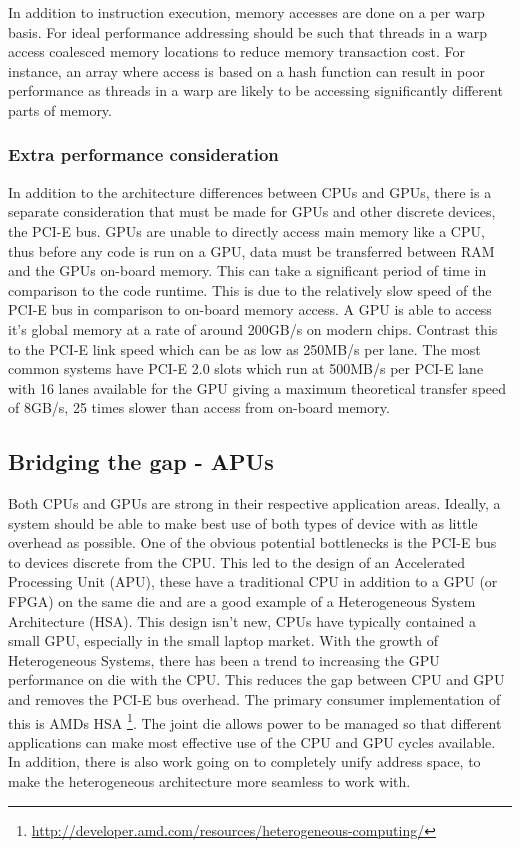 In addition to instruction execution, memory accesses are done on a per warp
basis. For ideal performance addressing should be such that threads in a warp
access coalesced memory locations to reduce memory transaction cost. For
instance, an array where access is based on a hash function can result in poor
performance as threads in a warp are likely to be accessing significantly
different parts of memory.

\subsubsection{Extra performance consideration}

In addition to the architecture differences between CPUs and GPUs, there is a
separate consideration that must be made for GPUs and other discrete devices,
the PCI-E bus. GPUs are unable to directly access main memory like a CPU, thus
before any code is run on a GPU, data must be transferred between RAM and the
GPUs on-board memory. This can take a significant period of time in comparison
to the code runtime. This is due to the relatively slow speed of the PCI-E bus
in comparison to on-board memory access. A GPU is able to access it's global
memory at a rate of around 200GB/s on modern chips. Contrast this to the PCI-E
link speed which can be as low as 250MB/s per lane. The most common systems have
PCI-E 2.0 slots which run at 500MB/s per PCI-E lane with 16 lanes available for
the GPU giving a maximum theoretical transfer speed of 8GB/s, 25 times slower
than access from on-board memory.

\subsection{Bridging the gap - APUs}

Both CPUs and GPUs are strong in their respective application areas. Ideally, a
system should be able to make best use of both types of device with as little
overhead as possible. One of the obvious potential bottlenecks is the PCI-E bus
to devices discrete from the CPU. This led to the design of an Accelerated
Processing Unit (APU), these have a traditional CPU in addition to a GPU (or
FPGA) on the same die and are a good example of a Heterogeneous System
Architecture (HSA). This design isn't new, CPUs have typically contained a small
GPU, especially in the small laptop market. With the growth of Heterogeneous
Systems, there has been a trend to increasing the GPU performance on die with
the CPU. This reduces the gap between CPU and GPU and removes the PCI-E bus
overhead. The primary consumer implementation of this is AMDs HSA
\footnote{\url{http://developer.amd.com/resources/heterogeneous-computing/}}.
The joint die allows power to be managed so that different applications can make
most effective use of the CPU and GPU cycles available. In addition, there is
also work going on to completely unify address space, to make the heterogeneous
architecture more seamless to work with.

